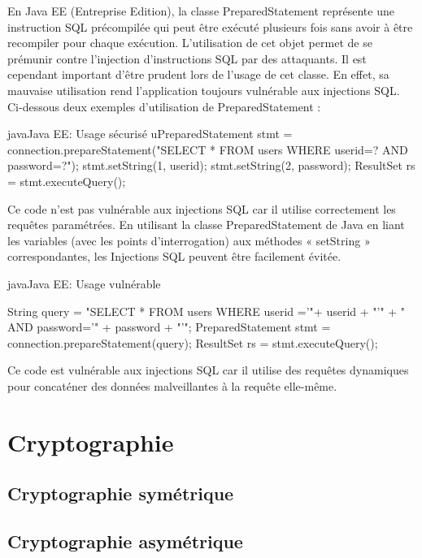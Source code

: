 \documentclass[twoside,a4paper,12pt,titlepage]{book}
\begin{document}
En Java EE (Entreprise Edition), la classe PreparedStatement représente une instruction SQL précompilée qui peut être exécuté plusieurs fois sans avoir à être recompiler pour chaque exécution.
L’utilisation de cet objet permet de se prémunir contre l’injection d’instructions SQL par des attaquants.
Il est cependant important d’être prudent lors de l’usage de cet classe. En effet, sa mauvaise utilisation rend l’application toujours vulnérable aux injections SQL.
Ci-dessous deux exemples d’utilisation de PreparedStatement :

\begin{Config}{java}{Java EE: Usage sécurisé }
uPreparedStatement stmt = connection.prepareStatement("SELECT * FROM users WHERE userid=? AND password=?");
stmt.setString(1, userid);
stmt.setString(2, password);
ResultSet rs = stmt.executeQuery();

\end{Config}	

Ce code n’est pas vulnérable aux injections SQL car il utilise correctement les requêtes paramétrées. En utilisant la classe PreparedStatement de Java en liant les variables (avec les points d'interrogation) aux méthodes « setString » correspondantes, les  Injections SQL peuvent être facilement évitée.

\begin{Config}{java}{Java EE: Usage vulnérable }

String query = "SELECT * FROM users WHERE userid ='"+ userid + "'" + " AND password='" + password + "'";
PreparedStatement stmt = connection.prepareStatement(query);
ResultSet rs = stmt.executeQuery();

\end{Config}	

Ce code est vulnérable aux injections SQL car il utilise des requêtes dynamiques pour concaténer des données malveillantes à la requête elle-même. 

\appendix
\chapter{Cryptographie}
\section{Cryptographie symétrique}
\section{Cryptographie asymétrique}
\end{document}
